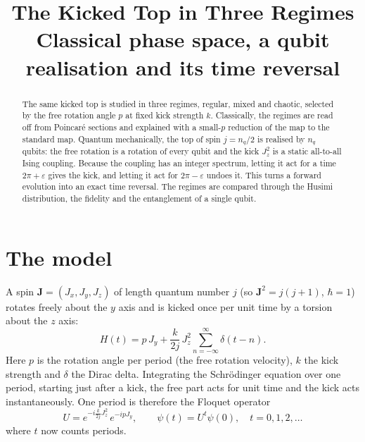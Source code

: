 \documentclass[11pt,a4paper]{article}
\title{The Kicked Top in Three Regimes\\[0.3em]
  \large Classical phase space, a qubit realisation and its time reversal}
\author{}
\date{}
\begin{document}
\maketitle

\begin{abstract}
The same kicked top is studied in three regimes, regular, mixed and chaotic, selected by the free rotation angle
$p$ at fixed kick strength $k$. Classically, the regimes are read off from Poincar\'e sections and explained with a
small-$p$ reduction of the map to the standard map. Quantum mechanically, the top of spin $j=n_q/2$ is realised by
$n_q$ qubits: the free rotation is a rotation of every qubit and the kick $J_z^2$ is a static all-to-all Ising
coupling. Because the coupling has an integer spectrum, letting it act for a time $2\pi+\varepsilon$ gives the kick, and
letting it act for $2\pi-\varepsilon$ undoes it. This turns a forward evolution into an exact time reversal. The
regimes are compared through the Husimi distribution, the fidelity and the entanglement of a single qubit.
\end{abstract}

\tableofcontents

\section{The model}\label{sec:model}

A spin $\bm J=(J_x,J_y,J_z)$ of length quantum number $j$ (so $\bm J^2=j(j+1)$, $\hbar=1$) rotates freely about the
$y$ axis and is kicked once per unit time by a torsion about the $z$ axis:
\begin{equation}\label{eq:H}
  H(t) = p\,J_y + \frac{k}{2j}\,J_z^2\sum_{n=-\infty}^{\infty}\delta(t-n).
\end{equation}
Here $p$ is the rotation angle per period (the free rotation velocity), $k$ the kick strength and $\delta$ the
Dirac delta. Integrating the Schr\"odinger equation over one period, starting just after a kick, the free part acts
for unit time and the kick acts instantaneously. One period is therefore the Floquet operator
\begin{equation}\label{eq:U}
  U = e^{-i\frac{k}{2j}J_z^2}\,e^{-ipJ_y},\qquad \psi(t) = U^t\psi(0),\quad t=0,1,2,\dots
\end{equation}
where $t$ now counts periods.
\end{document}
